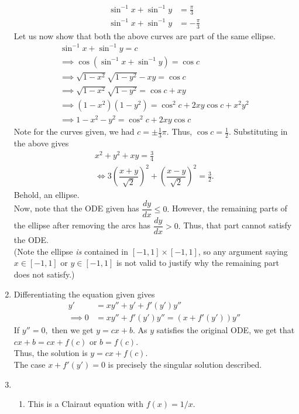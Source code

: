 \documentclass{article}
\begin{document}
\begin{enumerate}[label = Q.\arabic*.]
\begin{align*}
		\sin^{-1}x + \sin^{-1}y &= \frac{\pi}{3}\\
		\sin^{-1}x + \sin^{-1}y &= -\frac{\pi}{3}
	\end{align*}
	Let us now show that both the above curves are part of the same ellipse.
	\begin{align*} 
		\sin^{-1}x + \sin^{-1}y = c\\
		\implies \cos\left(\sin^{-1}x + \sin^{-1}y\right) = \cos c\\
		\implies \sqrt{1 - x^2}\sqrt{1 - y^2} - xy = \cos c\\
		\implies \sqrt{1 - x^2}\sqrt{1 - y^2} = \cos c + xy\\
		\implies (1 - x^2)(1 - y^2) = \cos^2c + 2xy\cos c + x^2y^2\\
		\implies 1 - x^2 - y^2 = \cos^2c + 2xy\cos c
	\end{align*}
	Note for the curves given, we had $c = \pm \frac{1}{3}\pi.$ Thus, $\cos c = \frac{1}{2}.$ Substituting in the above gives
	\begin{align*} 
		x^2 + y^2 + xy = \frac{3}{4}\\
		\iff 3\left(\dfrac{x + y}{\sqrt{2}}\right)^2 + \left(\dfrac{x - y}{\sqrt{2}}\right)^2 = \frac{3}{2}.
	\end{align*}
	Behold, an ellipse.\\
	Now, note that the ODE given has $\dfrac{dy}{dx} \le 0.$ However, the remaining parts of the ellipse after removing the arcs has $\dfrac{dy}{dx} > 0.$ Thus, that part cannot satisfy the ODE.\\
	(Note the ellipse \emph{is} contained in $[-1, 1] \times [-1, 1]$, so any argument saying $x \in [-1, 1]$ or $y \in [-1, 1]$ is not valid to justify why the remaining part does not satisfy.)
	\item Differentiating the equation given gives
	\begin{align*} 
		y' &= xy'' + y' + f'(y')y''\\
		\implies 0 &= xy'' + f'(y')y'' = (x + f'(y'))y''
	\end{align*}
	If $y'' = 0,$ then we get $y = cx + b.$ As $y$ satisfies the original ODE, we get that $cx + b = cx + f(c)$ or $b = f(c).$\\
	Thus, the solution is $y = cx + f(c).$\\
	The case $x + f'(y') = 0$ is precisely the singular solution described.
	\item 
	\begin{enumerate}[label = (\roman*)] 
		\item This is a Clairaut equation with $f(x) = 1/x.$\\

\end{enumerate}
\end{enumerate}
\end{document}
